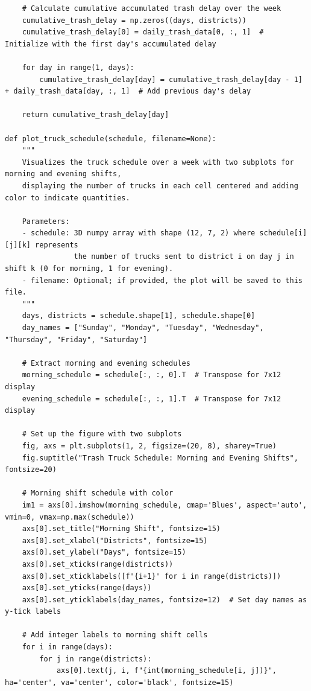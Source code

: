 \documentclass{article}
\begin{document}
\begin{verbatim}
    # Calculate cumulative accumulated trash delay over the week
    cumulative_trash_delay = np.zeros((days, districts))
    cumulative_trash_delay[0] = daily_trash_data[0, :, 1]  # Initialize with the first day's accumulated delay
    
    for day in range(1, days):
        cumulative_trash_delay[day] = cumulative_trash_delay[day - 1] + daily_trash_data[day, :, 1]  # Add previous day's delay
    
    return cumulative_trash_delay[day]

def plot_truck_schedule(schedule, filename=None):
    """
    Visualizes the truck schedule over a week with two subplots for morning and evening shifts,
    displaying the number of trucks in each cell centered and adding color to indicate quantities.
    
    Parameters:
    - schedule: 3D numpy array with shape (12, 7, 2) where schedule[i][j][k] represents
                the number of trucks sent to district i on day j in shift k (0 for morning, 1 for evening).
    - filename: Optional; if provided, the plot will be saved to this file.
    """
    days, districts = schedule.shape[1], schedule.shape[0]
    day_names = ["Sunday", "Monday", "Tuesday", "Wednesday", "Thursday", "Friday", "Saturday"]

    # Extract morning and evening schedules
    morning_schedule = schedule[:, :, 0].T  # Transpose for 7x12 display
    evening_schedule = schedule[:, :, 1].T  # Transpose for 7x12 display

    # Set up the figure with two subplots
    fig, axs = plt.subplots(1, 2, figsize=(20, 8), sharey=True)
    fig.suptitle("Trash Truck Schedule: Morning and Evening Shifts", fontsize=20)

    # Morning shift schedule with color
    im1 = axs[0].imshow(morning_schedule, cmap='Blues', aspect='auto', vmin=0, vmax=np.max(schedule))
    axs[0].set_title("Morning Shift", fontsize=15)
    axs[0].set_xlabel("Districts", fontsize=15)
    axs[0].set_ylabel("Days", fontsize=15)
    axs[0].set_xticks(range(districts))
    axs[0].set_xticklabels([f'{i+1}' for i in range(districts)])
    axs[0].set_yticks(range(days))
    axs[0].set_yticklabels(day_names, fontsize=12)  # Set day names as y-tick labels

    # Add integer labels to morning shift cells
    for i in range(days):
        for j in range(districts):
            axs[0].text(j, i, f"{int(morning_schedule[i, j])}", ha='center', va='center', color='black', fontsize=15)


\end{verbatim}
\end{document}
